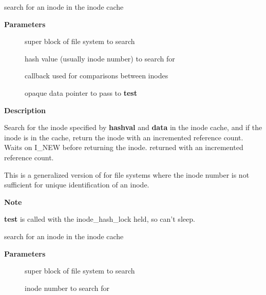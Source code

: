 \documentclass[a4paper,8pt,english]{sphinxmanual}
\begin{document}
\begin{fulllineitems}
\label{filesystems/index:c.ilookup5}
search for an inode in the inode cache

\end{fulllineitems}


\textbf{Parameters}
\begin{description}
\item[{}] \leavevmode
super block of file system to search

\item[{}] \leavevmode
hash value (usually inode number) to search for

\item[{}] \leavevmode
callback used for comparisons between inodes

\item[{}] \leavevmode
opaque data pointer to pass to \textbf{test}

\end{description}

\textbf{Description}

Search for the inode specified by \textbf{hashval} and \textbf{data} in the inode cache,
and if the inode is in the cache, return the inode with an incremented
reference count.  Waits on I\_NEW before returning the inode.
returned with an incremented reference count.

This is a generalized version of {\hyperref[filesystems/index:c.ilookup]{\emph{}}} for file systems where the
inode number is not sufficient for unique identification of an inode.

\textbf{Note}

\textbf{test} is called with the inode\_hash\_lock held, so can't sleep.

\begin{fulllineitems}
\label{filesystems/index:c.ilookup}
search for an inode in the inode cache

\end{fulllineitems}


\textbf{Parameters}
\begin{description}
\item[{}] \leavevmode
super block of file system to search

\item[{}] \leavevmode
inode number to search for

\end{description}
\end{document}
